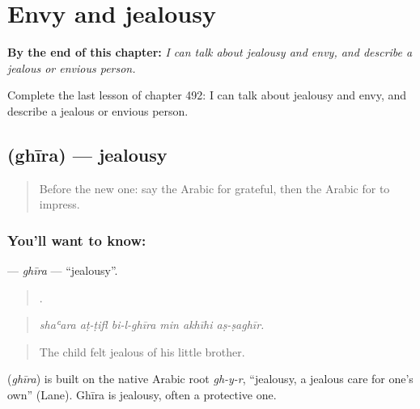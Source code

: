 
\chapter{Envy and jealousy}
\label{ch:ar-envy-and-jealousy}

\begin{chapteropening}
\textbf{By the end of this chapter:} \emph{I can talk about jealousy and envy, and describe a jealous or envious person.}

Complete the last lesson of chapter 492: I can talk about jealousy and envy, and describe a jealous or envious person.
\end{chapteropening}

\section[\texorpdfstring{\ar{غيرة} (ghīra)}{غيرة (ghīra)}]{ (ghīra) — jealousy}

\label{lesson:AR-C492-ghira}



\begin{quote}
Before the new one: say the Arabic for grateful, then the Arabic for to impress.
\end{quote}

\subsection*{You'll want to know: }
\textbf{} — \emph{ghīra} — \textquotedblleft{}jealousy\textquotedblright{}.

\begin{quote}
     .
\end{quote}

\begin{quote}
\emph{shaʿara aṭ-ṭifl bi-l-ghīra min akhīhi aṣ-ṣaghīr.}
\end{quote}

\begin{quote}
The child felt jealous of his little brother.
\end{quote}

\begin{cousinweb}
\textbf{} (\emph{ghīra}) is built on the native Arabic root \emph{gh-y-r}, \textquotedblleft{}jealousy, a jealous care for one's own\textquotedblright{} (Lane). Ghīra is jealousy, often a protective one.
\end{cousinweb}

